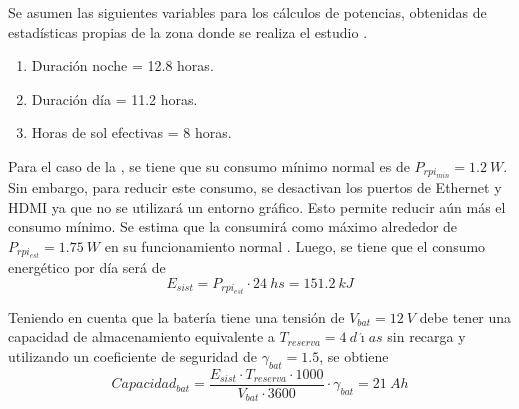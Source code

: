 Se asumen las siguientes variables para los cálculos de potencias, obtenidas de estadísticas propias de la zona donde se realiza el estudio \cite{ref:weather_bariloche}.
\begin{enumerate}
	\item Duración noche = 12.8 horas.
	\item Duración día = 11.2 horas.
	\item Horas de sol efectivas = 8 horas.
\end{enumerate}

Para el caso de la \rpi, se tiene que su consumo mínimo normal es de $P_{rpi_{min}} = 1.2 \ W$. Sin embargo, para reducir este consumo, se desactivan los puertos de Ethernet y HDMI ya que no se utilizará un entorno gráfico. Esto permite reducir aún más el consumo mínimo. Se estima que la \rspi consumirá como máximo alrededor de $P_{rpi_{est}} = 1.75 \ W$ en su funcionamiento normal \cite{ref:pot_rpi}. Luego, se tiene que el consumo energético por día será de
\begin{equation}
	E_{sist} = P_{rpi_{est}}\cdot 24 \ hs = 151.2 \ kJ
\end{equation}

Teniendo en cuenta que la batería tiene una tensión de $V_{bat} = 12 \ V$ debe tener una capacidad de almacenamiento equivalente a $T_{reserva} = 4 \ d\acute{\imath}as$ sin recarga \cite{ref:weather_bariloche} y utilizando un coeficiente de seguridad de $\gamma_{bat} = 1.5$, se obtiene
\begin{equation}
	Capacidad_{bat} = \frac{E_{sist}\cdot T_{reserva}\cdot 1000}{V_{bat}\cdot 3600}\cdot \gamma_{bat} = 21 \ Ah
\end{equation}


